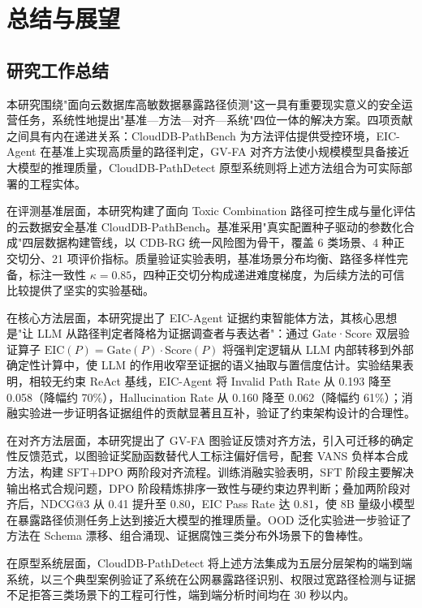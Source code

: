 \documentclass[a4paper,12pt]{ctexart}
\begin{document}
\section{总结与展望}

\subsection{研究工作总结}

本研究围绕"面向云数据库高敏数据暴露路径侦测"这一具有重要现实意义的安全运营任务，系统性地提出"基准—方法—对齐—系统"四位一体的解决方案。四项贡献之间具有内在递进关系：CloudDB-PathBench 为方法评估提供受控环境，EIC-Agent 在基准上实现高质量的路径判定，GV-FA 对齐方法使小规模模型具备接近大模型的推理质量，CloudDB-PathDetect 原型系统则将上述方法组合为可实际部署的工程实体。

在评测基准层面，本研究构建了面向 Toxic Combination 路径可控生成与量化评估的云数据安全基准 CloudDB-PathBench。基准采用"真实配置种子驱动的参数化合成"四层数据构建管线，以 CDB-RG 统一风险图为骨干，覆盖 6 类场景、4 种正交切分、21 项评价指标。质量验证实验表明，基准场景分布均衡、路径多样性完备，标注一致性 $\kappa = 0.85$，四种正交切分构成递进难度梯度，为后续方法的可信比较提供了坚实的实验基础。

在核心方法层面，本研究提出了 EIC-Agent 证据约束智能体方法，其核心思想是"让 LLM 从路径判定者降格为证据调查者与表达者"：通过 Gate·Score 双层验证算子 $\mathrm{EIC}(P) = \mathrm{Gate}(P) \cdot \mathrm{Score}(P)$ 将强判定逻辑从 LLM 内部转移到外部确定性计算中，使 LLM 的作用收窄至证据的语义抽取与置信度估计。实验结果表明，相较无约束 ReAct 基线，EIC-Agent 将 Invalid Path Rate 从 0.193 降至 0.058（降幅约 70\%），Hallucination Rate 从 0.160 降至 0.062（降幅约 61\%）；消融实验进一步证明各证据组件的贡献显著且互补，验证了约束架构设计的合理性。

在对齐方法层面，本研究提出了 GV-FA 图验证反馈对齐方法，引入可迁移的确定性反馈范式，以图验证奖励函数替代人工标注偏好信号，配套 VANS 负样本合成方法，构建 SFT+DPO 两阶段对齐流程。训练消融实验表明，SFT 阶段主要解决输出格式合规问题，DPO 阶段精炼排序一致性与硬约束边界判断；叠加两阶段对齐后，NDCG@3 从 0.41 提升至 0.80，EIC Pass Rate 达 0.81，使 8B 量级小模型在暴露路径侦测任务上达到接近大模型的推理质量。OOD 泛化实验进一步验证了方法在 Schema 漂移、组合涌现、证据腐蚀三类分布外场景下的鲁棒性。

在原型系统层面，CloudDB-PathDetect 将上述方法集成为五层分层架构的端到端系统，以三个典型案例验证了系统在公网暴露路径识别、权限过宽路径检测与证据不足拒答三类场景下的工程可行性，端到端分析时间均在 30 秒以内。
\end{document}
